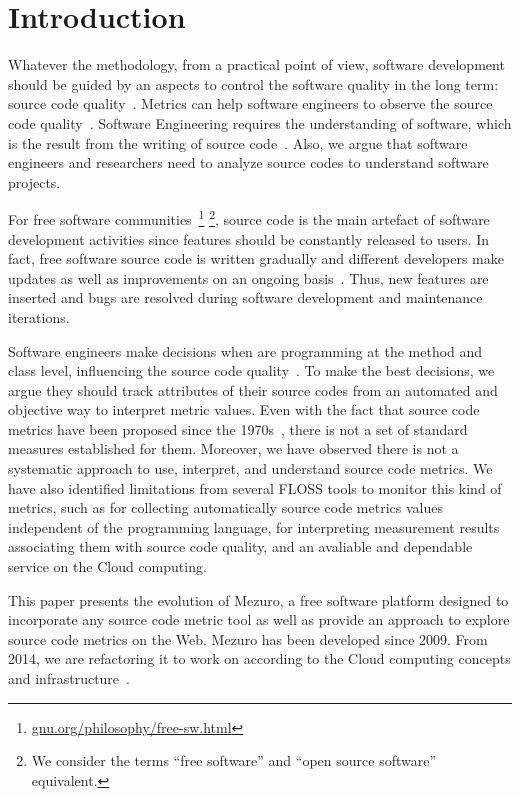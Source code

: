 \section{Introduction}
\label{introduction}

Whatever the methodology, from a practical point of view, software development
should be guided by an aspects to control the software quality in the long
term: source code quality~\cite{martin2008}. Metrics can help software
engineers to observe the source code quality~\cite{SEI88}. Software Engineering
requires the understanding of software, which is the result from the writing of
source code~\cite{martin2008}. Also, we argue that software engineers and
researchers need to analyze source codes to understand software projects.

For free software communities~\footnote{\url{gnu.org/philosophy/free-sw.html}}
\footnote{We consider the terms ``free software'' and ``open source software''
equivalent.}, source code is the main artefact of software development
activities since features should be constantly released to users. In fact,
free software source code is written gradually and different developers make
updates as well as improvements on an ongoing basis~\cite{martin2008}. Thus,
new features are inserted and bugs are resolved during software development and
maintenance iterations.

Software engineers make decisions when are programming at the method and class
level, influencing the source code quality~\cite{beck2007}. To make the best
decisions, we argue they should track attributes of their source codes from an
automated and objective way to interpret metric values. Even with the fact that
source code metrics have been proposed since the 1970s~\cite{SEI88}, there is
not a set of standard measures established for them.  Moreover, we have
observed there is not a systematic approach to use, interpret, and understand
source code metrics. We have also identified limitations from several FLOSS
tools to monitor this kind of metrics, such as for collecting automatically
source code metrics values independent of the programming language, for
interpreting measurement results associating them with source code quality, and
an avaliable and dependable service on the Cloud computing.

This paper presents the evolution of Mezuro, a free software platform
designed to incorporate any source code metric tool as well as provide an
approach to explore source code metrics on the Web. Mezuro has been developed
since 2009. From 2014, we are refactoring it to work on according to the Cloud
computing concepts and infrastructure~\cite{louridas2010}.

